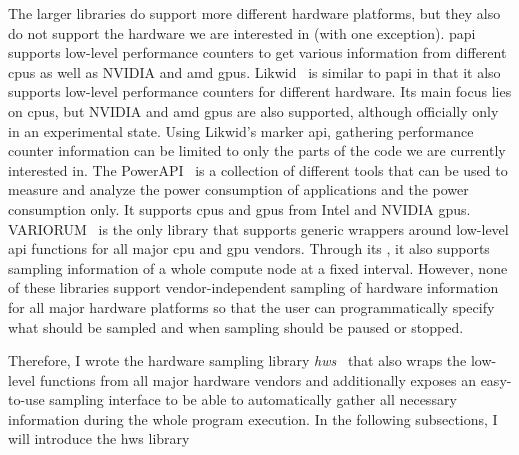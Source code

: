 The larger libraries do support more different hardware platforms, but they also do not support the hardware we are interested in (with one exception). 
\gls{papi}~\cite{mucci_papi_1999} supports low-level performance counters to get various information from different \glspl{cpu} as well as NVIDIA and \gls{amd} \glspl{gpu}. 
Likwid~\cite{thomas_gruber_likwid_2023} is similar to \gls{papi} in that it also supports low-level performance counters for different hardware. 
Its main focus lies on \glspl{cpu}, but NVIDIA and \gls{amd} \glspl{gpu} are also supported, although officially only in an experimental state. 
Using Likwid's marker \gls{api}, gathering performance counter information can be limited to only the parts of the code we are currently interested in. 
The PowerAPI~\cite{fieni_powerapi_2024} is a collection of different tools that can be used to measure and analyze the power consumption of applications and the power consumption only. 
It supports \glspl{cpu} and \glspl{gpu} from Intel and NVIDIA \glspl{gpu}. 
VARIORUM~\cite{noauthor_variorum_2024} is the only library that supports generic wrappers around low-level \gls{api} functions for all major \gls{cpu} and \gls{gpu} vendors. 
Through its , it also supports sampling information of a whole compute node at a fixed interval. 
However, none of these libraries support vendor-independent sampling of hardware information for all major hardware platforms so that the user can programmatically specify what should be sampled and when sampling should be paused or stopped. 

Therefore, I wrote the hardware sampling library \textit{hws}~\cite{breyer_hws_2024-1, breyer_hardware-independent_2024, breyer_hws_2024} that also wraps the low-level functions from all major hardware vendors and additionally exposes an easy-to-use sampling interface to be able to automatically gather all necessary information during the whole program execution. 
In the following subsections, I will introduce the hws library 


